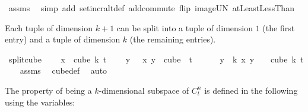 \begin{isabellebody}
\ assms\ \isamarkupfalse%
\ {\isacharparenleft}{\kern0pt}simp\ add{\isacharcolon}{\kern0pt}\ set{\isacharunderscore}{\kern0pt}incr{\isacharunderscore}{\kern0pt}altdef\ add{\isachardot}{\kern0pt}commute\ flip{\isacharcolon}{\kern0pt}\ image{\isacharunderscore}{\kern0pt}UN\ atLeast{}LessThan{\isacharparenright}{\kern0pt}%
\endisatagproof
{\isafoldproof}%
%
\isadelimproof
%
\endisadelimproof
%
\begin{isamarkuptext}%
Each tuple of dimension $k+1$ can be split into a tuple of dimension $1$ (the first entry) and a tuple of dimension $k$ (the remaining entries).%
\end{isamarkuptext}\isamarkuptrue%
\isamarkupfalse%
\ split{\isacharunderscore}{\kern0pt}cube{\isacharcolon}{\kern0pt}\ \isanewline
\ \ \ {\isachardoublequoteopen}x\ {\isasymin}\ cube\ {\isacharparenleft}{\kern0pt}k{\isacharplus}{\kern0pt}{}{\isacharparenright}{\kern0pt}\ t{\isachardoublequoteclose}\ \isanewline
\ \ \ {\isachardoublequoteopen}{\isacharparenleft}{\kern0pt}{\isasymlambda}y\ {\isasymin}\ {\isacharbraceleft}{\kern0pt}{\isachardot}{\kern0pt}{\isachardot}{\kern0pt}{\isacharless}{\kern0pt}{}{\isacharbraceright}{\kern0pt}{\isachardot}{\kern0pt}\ x\ y{\isacharparenright}{\kern0pt}\ {\isasymin}\ cube\ {}\ t{\isachardoublequoteclose}\ \isanewline
\ \ \ \ \ {\isachardoublequoteopen}{\isacharparenleft}{\kern0pt}{\isasymlambda}y\ {\isasymin}\ {\isacharbraceleft}{\kern0pt}{\isachardot}{\kern0pt}{\isachardot}{\kern0pt}{\isacharless}{\kern0pt}k{\isacharbraceright}{\kern0pt}{\isachardot}{\kern0pt}\ x\ {\isacharparenleft}{\kern0pt}y\ {\isacharplus}{\kern0pt}\ {}{\isacharparenright}{\kern0pt}{\isacharparenright}{\kern0pt}\ {\isasymin}\ cube\ k\ t{\isachardoublequoteclose}\isanewline
%
\isadelimproof
\ \ %
\endisadelimproof
%
\isatagproof
{}\isamarkupfalse%
\ assms\ \isamarkupfalse%
\ cube{\isacharunderscore}{\kern0pt}def\ \isamarkupfalse%
\ auto%
\endisatagproof
{\isafoldproof}%
%
\isadelimproof
%
\endisadelimproof
%
\isadelimdocument
%
\endisadelimdocument
%
\isatagdocument
%
\isamarkuptrue%
%
\endisatagdocument
{\isafolddocument}%
%
\isadelimdocument
%
\endisadelimdocument
%
\begin{isamarkuptext}%
The property of being a $k$-dimensional subspace of $C^n_t$ is defined in the following using the variables:


\end{isamarkuptext}
\end{isabellebody}
